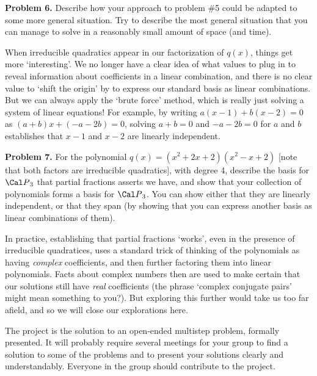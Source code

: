 \msk

{\bf Problem 6.} Describe how your approach to problem \#5 could be adapted to some more general
situation. Try to describe the most general situation that you can manage to solve in a reasonably small
amount of space (and time).

\bsk

When irreducible quadratics appear in our factorization of $q(x)$, things get more `interesting'.
We no longer have a clear idea of what values to plug in to reveal information about coefficients 
in a linear combination, and there is no clear value to `shift the origin' by to express our 
standard basis as linear combinations. But we can always apply the `brute force' method, which is 
really just solving a system of linear equations! For example, by writing $a(x-1)+b(x-2)=0$
as $(a+b)x+(-a-2b)=0$, solving $a+b=0$ and $-a-2b=0$ for $a$ and $b$ establishes that
$x-1$ and $x-2$ are linearly independent.

\msk

{\bf Problem 7.} For the polynomial $q(x)=(x^2+2x+2)(x^2-x+2)$ [note that
both factors are irreducible quadratics], with degree 4, describe the basis for 
${\Cal P}_{3}$ that partial fractions asserts we have, and show that your collection of polynomials
forms a basis for ${\Cal P}_{3}$. You can show either that they are linearly independent, or
that they span (by showing that you can express another basis as linear combinations of them).

\msk

In practice, establishing that partial fractions `works', even in the presence of irreducible
quadratices, uses a standard trick of thinking of the polynomials as having {\it complex} coefficients,
and then further factoring them into linear polynomials. Facts about complex numbers then are
used to make certain that our solutions still have {\it real} coefficients (the phrase `complex
conjugate pairs' might mean something to you?). But exploring this further would take us too far afield,
and so we will close our explorations here.

\bsk 


\medskip

The project is the solution to an open-ended multistep problem, formally 
presented. It will
probably require several meetings for your group to find a solution to some of the 
problems and to present your solutions
clearly and understandably. Everyone in the group should contribute to the project.

